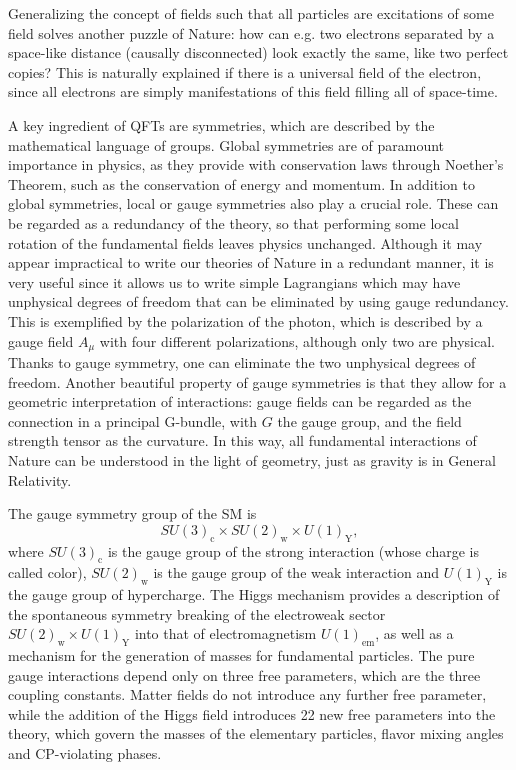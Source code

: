 Generalizing the concept of fields such that all particles are excitations of some field solves another puzzle of Nature: how can e.g. two electrons separated by a space-like distance (causally disconnected) look exactly the same, like two perfect copies? This is naturally explained if there is a universal field of the electron, since all electrons are simply manifestations of this field filling all of space-time. 

A key ingredient of QFTs are symmetries, which are described by the mathematical language of groups. Global symmetries are of paramount importance in physics, as they provide with conservation laws through Noether's Theorem, such as the conservation of energy and momentum. In addition to global symmetries, local or gauge symmetries also play a crucial role. These can be regarded as a redundancy of the theory, so that performing some local rotation of the fundamental fields leaves physics unchanged. Although it may appear impractical to write our theories of Nature in a redundant manner, it is very useful since it allows us to write simple Lagrangians which may have unphysical degrees of freedom that can be eliminated by using gauge redundancy. This is exemplified by the polarization of the photon, which is described by a gauge field $A_{\mu}$ with four different polarizations, although only two are physical. Thanks to gauge symmetry, one can eliminate the two unphysical degrees of freedom. Another beautiful property of gauge symmetries is that they allow for a geometric interpretation of interactions: gauge fields can be regarded as the connection in a principal G-bundle, with $G$ the gauge group, and the field strength tensor as the curvature. In this way, all fundamental interactions of Nature can be understood in the light of geometry, just as gravity is in General Relativity.

The gauge symmetry group of the SM is
\begin{equation*}
SU(3)_{\textrm{c}}\times SU(2)_{\textrm{w}}\times U(1)_{\textrm{Y}},
\end{equation*}
where $SU(3)_{\textrm{c}}$ is the gauge group of the strong interaction (whose charge is called color), $SU(2)_{\textrm{w}}$ is the gauge group of the weak interaction and $U(1)_{\textrm{Y}}$ is the gauge group of hypercharge. The Higgs mechanism provides a description of the spontaneous symmetry breaking of the electroweak sector $SU(2)_{\textrm{w}}\times U(1)_{\textrm{Y}}$ into that of electromagnetism $U(1)_{\textrm{em}}$, as well as a mechanism for the generation of masses for fundamental particles. The pure gauge interactions depend only on three free parameters, which are the three coupling constants. Matter fields do not introduce any further free parameter, while the addition of the Higgs field introduces 22 new free parameters into the theory, which govern the masses of the elementary particles, flavor mixing angles and CP-violating phases.


